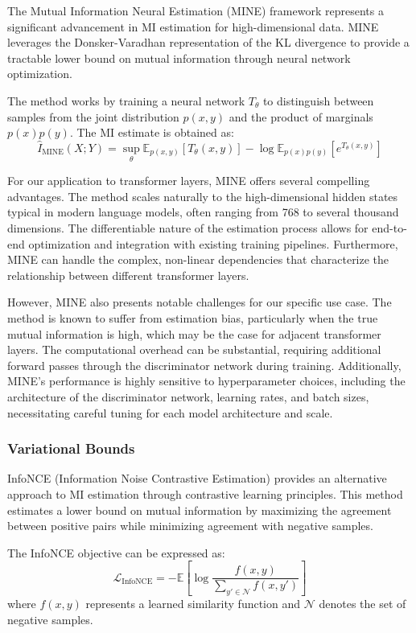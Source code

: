 The Mutual Information Neural Estimation (MINE) framework \citep{belghazi2018mutual} represents a significant advancement in MI estimation for high-dimensional data. MINE leverages the Donsker-Varadhan representation of the KL divergence to provide a tractable lower bound on mutual information through neural network optimization.

The method works by training a neural network $T_\theta$ to distinguish between samples from the joint distribution $p(x,y)$ and the product of marginals $p(x)p(y)$. The MI estimate is obtained as:
\[
\hat{I}_{\text{MINE}}(X;Y) = \sup_\theta \mathbb{E}_{p(x,y)}[T_\theta(x,y)] - \log\mathbb{E}_{p(x)p(y)}[e^{T_\theta(x,y)}]
\]

For our application to transformer layers, MINE offers several compelling advantages. The method scales naturally to the high-dimensional hidden states typical in modern language models, often ranging from 768 to several thousand dimensions. The differentiable nature of the estimation process allows for end-to-end optimization and integration with existing training pipelines. Furthermore, MINE can handle the complex, non-linear dependencies that characterize the relationship between different transformer layers.

However, MINE also presents notable challenges for our specific use case. The method is known to suffer from estimation bias, particularly when the true mutual information is high, which may be the case for adjacent transformer layers. The computational overhead can be substantial, requiring additional forward passes through the discriminator network during training. Additionally, MINE's performance is highly sensitive to hyperparameter choices, including the architecture of the discriminator network, learning rates, and batch sizes, necessitating careful tuning for each model architecture and scale.

\subsubsection{Variational Bounds}

InfoNCE (Information Noise Contrastive Estimation) \citep{oord2018representation} provides an alternative approach to MI estimation through contrastive learning principles. This method estimates a lower bound on mutual information by maximizing the agreement between positive pairs while minimizing agreement with negative samples.

The InfoNCE objective can be expressed as:
\[
\mathcal{L}_{\text{InfoNCE}} = -\mathbb{E}\left[\log\frac{f(x,y)}{\sum_{y' \in \mathcal{N}} f(x,y')}\right]
\]
where $f(x,y)$ represents a learned similarity function and $\mathcal{N}$ denotes the set of negative samples.

